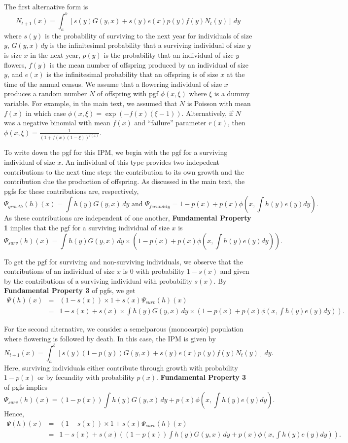\documentclass[12pt]{amsart}\usepackage[]{graphicx}\usepackage[]{color}
\begin{document}
The first alternative form is 
\[
N_{t+1}(x)=\int_a^b \left[ s(y)G(y, x)+s(y)e(x)p(y)f(y)N_t(y)\right]\, dy
\]
where $s(y)$ is the probability of surviving to the next year for individuals of size $y$, $G(y, x) \, dy$ is the infinitesimal probability that a surviving individual of size $y$ is size $x$ in the next year, $p(y)$ is the probability that an individual of size $y$ flowers, $f(y)$ is the mean number of offspring produced by an individual of size $y$, and $e(x)$ is the infinitesimal probability that an offspring is of size $x$ at the time of the annual census. We assume that a flowering individual of size $x$ produces a random number $N$ of offspring with pgf $\phi(x,\xi)$ where $\xi$ is a dummy variable. For example, in the main text, we assumed that $N$ is Poisson with mean $f(x)$ in which case $\phi(x, \xi)=\exp(-f(x)(\xi-1))$. Alternatively, if $N$ was a negative binomial with mean $f(x)$ and ``failure'' parameter $r(x)$, then $\phi(x,\xi)=\frac{1}{(1+f(x)(1-\xi))^{r(x)}}$.

To write down the pgf for this IPM, we begin with the pgf for a surviving individual of size $x$. An individual of this type provides two indepedent contributions to the next time step: the contribution to its own growth and the contribution due the production of offspring. As discussed in the main text, the pgfs for these contributions are, respectively, 
\[
\Psi_{growth}(h)(x)=\int h(y) G(y,x)\,dy \mbox{ and } \Psi_{fecundity}=1-p(x)+p(x)\phi(x,\int h(y)e(y)dy).
\]
As these contributions are independent of one another, \textbf{Fundamental Property 1} implies that the pgf for a surviving individual of size $x$ is  
\[
\Psi_{surv}(h)(x)=\int h(y) G(y,x)\,dy \times \left(1-p(x)+p(x)\phi(x,\int h(y)e(y)dy)\right). 
\]

To get the pgf for surviving and non-surviving individuals, we observe that the contributions of an individual of size $x$ is $0$ with probability $1-s(x)$ and given by the contributions of a surviving individual with probability $s(x)$. By \textbf{Fundamental Property 3} of pgfs, we get 
\begin{eqnarray*}
\Psi (h)(x)&=&(1-s(x))\times 1+s(x)\Psi_{surv}(h)(x)\\
&=& 1-s(x)+s(x)\times \int h(y) G(y,x)\,dy \times \left(1-p(x)+p(x)\phi(x,\int h(y)e(y)dy)\right).
\end{eqnarray*}

For the second alternative, we consider a semelparous (monocarpic) population where flowering is followed by death. In this case, the IPM is given by 
\[
N_{t+1}(x)=\int_a^b \left[ s(y)(1-p(y))G(y, x)+s(y)e(x)p(y)f(y)N_t(y)\right]\, dy.
\]
Here, surviving individuals either contribute through growth with probability $1-p(x)$ or by fecundity with probability $p(x)$. \textbf{Fundamental Property 3} of pgfs implies 
\[
\Psi_{surv}(h)(x)=(1-p(x))\int h(y) G(y,x)\,dy +p(x)\phi(x,\int h(y)e(y)dy). 
\]
Hence, 
\begin{eqnarray*}
\Psi (h)(x)&=&(1-s(x))\times 1 +s(x)\Psi_{surv}(h)(x)\\
&=& 1-s(x) + s(x)\left((1-p(x))\int h(y) G(y,x)\,dy +p(x)\phi(x,\int h(y)e(y)dy)\right). 
\end{eqnarray*}
\end{document}

